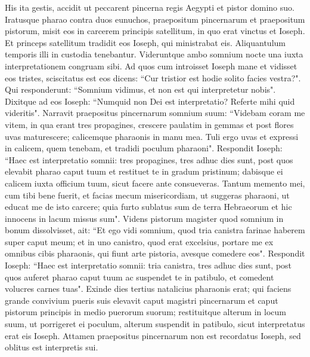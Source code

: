 \begin{biblechapter}  
\verse His ita gestis, accidit ut peccarent pincerna regis Aegypti et pistor domino suo. 
\verse Iratusque pharao contra duos eunuchos, praepositum pincernarum et praepositum pistorum, 
\verse misit eos in carcerem principis satellitum, in quo erat vinctus et Ioseph. 
\verse Et princeps satellitum tradidit eos Ioseph, qui ministrabat eis. Aliquantulum temporis illi in custodia tenebantur. 
\verse Videruntque ambo somnium nocte una iuxta interpretationem congruam sibi. 
\verse Ad quos cum introisset Ioseph mane et vidisset eos tristes, 
\verse sciscitatus est eos dicens: “Cur tristior est hodie solito facies vestra?". 
\verse Qui responderunt: “Somnium vidimus, et non est qui interpretetur nobis". Dixitque ad eos Ioseph: “Numquid non Dei est interpretatio? Referte mihi quid videritis". 
\verse Narravit praepositus pincernarum somnium suum: “Videbam coram me vitem,  
\verse in qua erant tres propagines, crescere paulatim in gemmas et post flores uvas maturescere; 
\verse calicemque pharaonis in manu mea. Tuli ergo uvas et expressi in calicem, quem tenebam, et tradidi poculum pharaoni". 
\verse Respondit Ioseph: “Haec est interpretatio somnii: tres propagines, tres adhuc dies sunt,  
\verse post quos elevabit pharao caput tuum et restituet te in gradum pristinum; dabisque ei calicem iuxta officium tuum, sicut facere ante consueveras. 
\verse Tantum memento mei, cum tibi bene fuerit, et facias mecum misericordiam, ut suggeras pharaoni, ut educat me de isto carcere; 
\verse quia furto sublatus sum de terra Hebraeorum et hic innocens in lacum missus sum". 
\verse Videns pistorum magister quod somnium in bonum dissolvisset, ait: “Et ego vidi somnium, quod tria canistra farinae haberem super caput meum; 
\verse et in uno canistro, quod erat excelsius, portare me ex omnibus cibis pharaonis, qui fiunt arte pistoria, avesque comedere eos". 
\verse Respondit Ioseph: “Haec est interpretatio somnii: tria canistra, tres adhuc dies sunt, 
\verse post quos auferet pharao caput tuum ac suspendet te in patibulo, et comedent volucres carnes tuas". 
\verse Exinde dies tertius natalicius pharaonis erat; qui faciens grande convivium pueris suis elevavit caput magistri pincernarum et caput pistorum principis in medio puerorum suorum; 
\verse restituitque alterum in locum suum, ut porrigeret ei poculum, 
\verse alterum suspendit in patibulo, sicut interpretatus erat eis Ioseph. 
\verse Attamen praepositus pincernarum non est recordatus Ioseph, sed oblitus est interpretis sui. 
\end{biblechapter}

